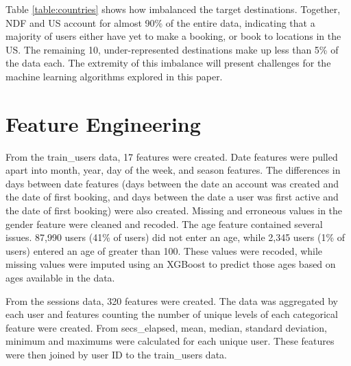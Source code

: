 \documentclass{article}
\begin{document}
Table \ref{table:countries} shows how imbalanced the target destinations. Together, NDF and US
account for almost 90\% of the entire data, indicating that a majority of users either 
have yet to make a booking, or book to locations in the US. The remaining 10, under-represented 
destinations make up less than 5\% of the data each. The extremity of this imbalance will present 
challenges for the machine learning algorithms explored in this paper.



\section{Feature Engineering}

From the train\_users data, 17 features were created. Date features were pulled apart into 
month, year, day of the week, and season features. The differences in days between date features 
(days between the date an account was created and the date of first booking, and days between the date a 
user was first active and the date of first booking) were also created. Missing and erroneous values in the gender feature 
were cleaned and recoded. The age feature contained several issues. 87,990 users (41\% of users) did 
not enter an age, while 2,345 users (1\% of users) entered an age of greater than 100. These values 
were recoded, while missing values were imputed using an XGBoost to predict those 
ages based on ages available in the data. 

From the sessions data, 320 features were created. The data was aggregated by each user and 
features counting the number of unique levels of each categorical feature were created. From secs\_elapsed, 
mean, median, standard deviation, minimum and maximums were calculated for each unique user. These features 
were then joined by user ID to the train\_users data. 
\end{document}
